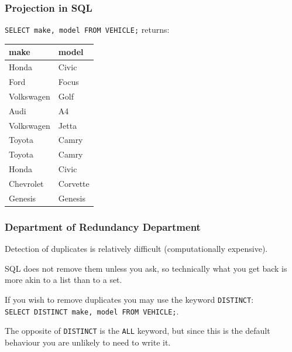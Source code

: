 \begin{frame}
\frametitle{Projection in SQL}

\texttt{SELECT make, model FROM VEHICLE;}  returns:

\begin{center}
\begin{tabular}{|l|l|} \hline
	\textbf{make} & \textbf{model} \\ \hline
	Honda & Civic \\ \hline
	Ford & Focus \\ \hline
	Volkswagen & Golf \\ \hline
	Audi & A4  \\ \hline
	Volkswagen & Jetta \\ \hline
	Toyota & Camry  \\ \hline
	Toyota & Camry  \\ \hline
	Honda & Civic  \\ \hline
	Chevrolet & Corvette  \\ \hline
	 Genesis & Genesis \\ \hline
\end{tabular}
\end{center}


\end{frame}



\begin{frame}
\frametitle{Department of Redundancy Department}

Detection of duplicates is relatively difficult (computationally expensive).

SQL does not remove them unless you ask, so technically what you get back is more akin to a list than to a set. 

If you wish to remove duplicates you may use the keyword \texttt{DISTINCT}:\\\texttt{SELECT DISTINCT make, model FROM VEHICLE;}.

The opposite of \texttt{DISTINCT} is the \texttt{ALL} keyword, but since this is the default behaviour you are unlikely to need to write it.

\end{frame}



